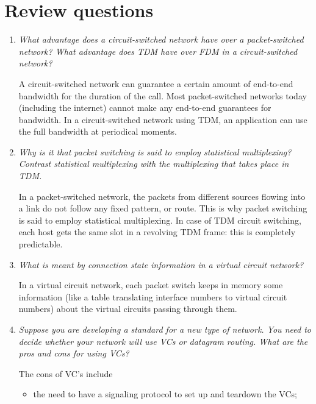 \section{Review questions}

\begin{enumerate}

  \item \emph{What advantage does a circuit-switched network have over
    a packet-switched network? What advantage does TDM have over FDM
    in a circuit-switched network?}

  A circuit-switched network can guarantee a certain amount of
  end-to-end bandwidth for the duration of the call. Most
  packet-switched networks today (including the internet) cannot make
  any end-to-end guarantees for bandwidth. In a circuit-switched
  network using TDM, an application can use the full bandwidth at
  periodical moments.

  \item \emph{Why is it that packet switching is said to employ
    statistical multiplexing? Contrast statistical multiplexing with
    the multiplexing that takes place in TDM.}

  In a packet-switched network, the packets from different sources
  flowing into a link do not follow any fixed pattern, or route. This
  is why packet switching is said to employ statistical
  multiplexing. In case of TDM circuit switching, each host gets the
  same slot in a revolving TDM frame: this is completely predictable.

  \item \emph{What is meant by connection state information in a
    virtual circuit network?}

  In a virtual circuit network, each packet switch keeps in memory
  some information (like a table translating interface numbers to
  virtual circuit numbers) about the virtual circuits passing through
  them.

  \item \emph{Suppose you are developing a standard for a new type of
    network. You need to decide whether your network will use VCs or
    datagram routing. What are the pros and cons for using VCs?}

   The cons of VC's include
   \begin{itemize}

     \item the need to have a signaling protocol to set up and
       teardown the VCs;


\end{itemize}
\end{enumerate}
